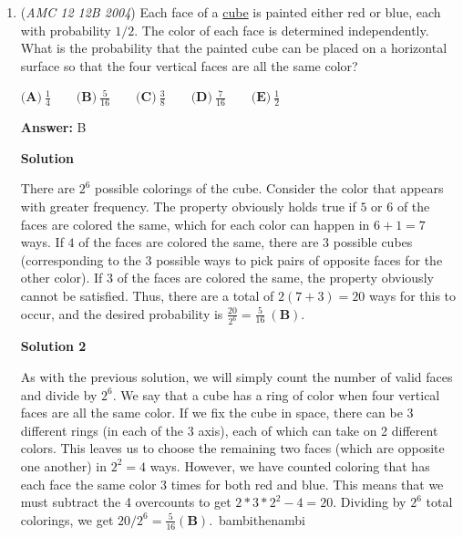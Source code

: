 \begin{enumerate}
 By the \href{https://artofproblemsolving.com/wiki/index.php?title=Pythagorean\_Theorem}{Pythagorean Theorem}, 
 \[r = \frac{DH}2 = \frac{\sqrt{20^2 - 16^2}}2 = 12\]Therefore, the answer is $\boxed{{A (6)}}.$



	\item (\textit{AMC 12 12B 2004}) Each face of a \href{https://artofproblemsolving.com/wiki/index.php?title=Cube}{cube} is painted either red or blue, each with probability $1/2$. The color of each face is determined independently. What is the probability that the painted cube can be placed on a horizontal surface so that the four vertical faces are all the same color?


 $\textbf{(A)}\ \frac14 \qquad \textbf{(B)}\ \frac {5}{16} \qquad \textbf{(C)}\ \frac38 \qquad \textbf{(D)}\ \frac {7}{16} \qquad \textbf{(E)}\ \frac12$

 \textbf{Answer: }B



\textbf{Solution}

There are $2^6$ possible colorings of the cube. Consider the color that appears with greater frequency. The property obviously holds true if $5$ or $6$ of the faces are colored the same, which for each color can happen in $6 + 1 = 7$ ways. If $4$ of the faces are colored the same, there are $3$ possible cubes (corresponding to the $3$ possible ways to pick pairs of opposite faces for the other color). If $3$ of the faces are colored the same, the property obviously cannot be satisfied. Thus, there are a total of $2(7 + 3) = 20$ ways for this to occur, and the desired probability is $\frac{20}{2^6} = \frac{5}{16}\ \mathbf{(B)}$.

 



\textbf{Solution 2}

As with the previous solution, we will simply count the number of valid faces and divide by $2^6$. We say that a cube has a ring of color when four vertical faces are all the same color. If we fix the cube in space, there can be $3$ different rings (in each of the $3$ axis), each of which can take on 2 different colors. This leaves us to choose the remaining two faces (which are opposite one another) in $2^2=4$ ways. However, we have counted coloring that has each face the same color $3$ times for both red and blue. This means that we must subtract the 4 overcounts to get $2*3*2^2-4=20$. Dividing by $2^6$ total colorings, we get $20/2^6=\frac{5}{16}\mathbf{(B)}$.~bambithenambi


\end{enumerate}

